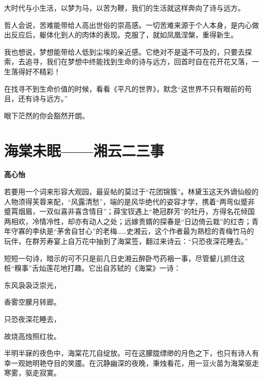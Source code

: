 \documentclass[openany,scheme = chinese, linespread = 1.5]{ctexbook}
\newcommand \name[1]{\begin{center} \kaishu \Large \bfseries #1 \end{center}}
\begin{document}
大时代与小生活，以梦为马，以苦为鞭，我们的生活就这样奔向了诗与远方。

哲人会说，苦难能带给人高出世俗的崇高感。一切苦难来源于个人本身，是内心做出反应后，躯体化到人的肉体的表现。克服了，就如凤凰涅槃，重得新生。

我也想说，梦想能带给人低到尘埃的亲近感。它绝对不是遥不可及的，只要去探索，去追寻，我们在梦想中终能找到生命的诗与远方，回首时自在花开花又落，一生落得好不精彩！

在找寻不到生命价值的时候，看看《平凡的世界》，默念“这世界不只有眼前的苟且，还有诗与远方。”

眼下茫然的你会豁然开朗。

\newpage
\section{海棠未眠——湘云二三事}
\name{高心怡}

若要用一个词来形容大观园，最妥帖的莫过于“花团锦簇”。林黛玉这天外谪仙般的人物须得芙蓉来配，“风露清愁”，端的是风华绝代的姿容才学，携着“两弯似蹙非蹙罥烟眉，一双似喜非喜含情目”；薛宝钗遇上“艳冠群芳”的牡丹，方得名花倾国两相欢，冷情冷性，却亦有动人之处；远嫁贵婿的探春是“日边倚云栽”的红杏；青年守寡的李纨是“茅舍自甘心”的老梅……史湘云，这个作者最为熟稔的青梅竹马的玩伴，在群芳寿宴上自万花中抽到了海棠签，翻过来诗云：“只恐夜深花睡去。”

短短一句诗，暗示的可不只是前几日史湘云醉卧芍药裀一事，尽管颦儿抓住这桩“糗事”舌灿莲花地打趣。它出自苏轼的《海棠》一诗：

\begin{center}
东风袅袅泛崇光，

香雾空朦月转廊。

只恐夜深花睡去，

故烧高烛照红妆。

\end{center}
半明半寐的夜色中，海棠花兀自绽放。可在这朦胧缥缈的月色之下，也只有诗人有幸一观她明艳夺目的笑靥。在沉静幽深的夜晚，秉烛看花，用一豆火苗为海棠驱走寒雾，驱走寂寞。
\end{document}
